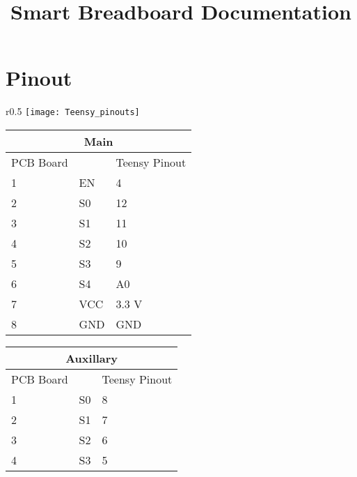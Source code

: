 \documentclass{article}
\title{Smart Breadboard Documentation}
\begin{document}
\maketitle

\section{Pinout}
\begin{table}[h]
\begin{wrapfigure}{r}{0.5\textwidth}
    \centering
    \texttt{[image: Teensy\_pinouts]}
\end{wrapfigure}
\begin{tabular}{|m{2.5cm}|m{1cm}|m{2.5cm}|}
\hline
\multicolumn{3}{|c|}{Main} \\
\hline
PCB Board &  & Teensy Pinout \\
\hline
1 & EN & 4 \\
2 & S0 & 12 \\
3 & S1 & 11 \\
4 & S2 & 10 \\
5 & S3 & 9 \\
6 & S4 & A0 \\
7 & VCC & 3.3 V \\
8 & GND & GND \\
\hline
\end{tabular}
\end{table}

\begin{table}[h]
\begin{tabular}{|m{2.5cm}|m{1cm}|m{2.5cm}|}
\hline
\multicolumn{3}{|c|}{Auxillary} \\
\hline
PCB Board &  & Teensy Pinout \\
\hline
1 & S0 & 8 \\
2 & S1 & 7 \\
3 & S2 & 6 \\
4 & S3 & 5 \\
\hline
\end{tabular}
\end{table}
\end{document}
